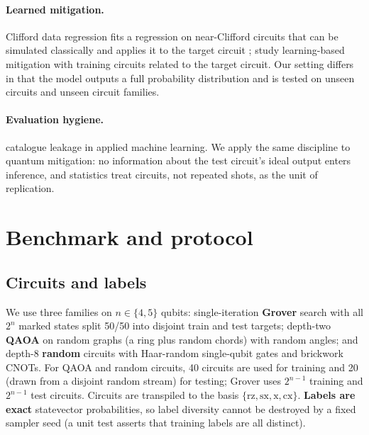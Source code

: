 \documentclass[11pt]{article}
\begin{document}
\paragraph{Learned mitigation.} Clifford data regression fits a regression on near-Clifford circuits that can be simulated classically and applies it to the target circuit \citep{czarnik2021}; \citet{strikis2021} study learning-based mitigation with training circuits related to the target circuit. Our setting differs in that the model outputs a full probability distribution and is tested on unseen circuits and unseen circuit families.
\paragraph{Evaluation hygiene.} \citet{kapoor2023} catalogue leakage in applied machine learning. We apply the same discipline to quantum mitigation: no information about the test circuit's ideal output enters inference, and statistics treat circuits, not repeated shots, as the unit of replication.

\section{Benchmark and protocol}\label{sec:protocol}
\subsection{Circuits and labels}
We use three families on $n\in\{4,5\}$ qubits: single-iteration \textbf{Grover} search \citep{grover1996} with all $2^n$ marked states split 50/50 into disjoint train and test targets; depth-two \textbf{QAOA} \citep{farhi2014} on random graphs (a ring plus random chords) with random angles; and depth-8 \textbf{random} circuits with Haar-random single-qubit gates and brickwork CNOTs. For QAOA and random circuits, 40 circuits are used for training and 20 (drawn from a disjoint random stream) for testing; Grover uses $2^{n-1}$ training and $2^{n-1}$ test circuits. Circuits are transpiled to the basis $\{\mathrm{rz},\mathrm{sx},\mathrm{x},\mathrm{cx}\}$. \textbf{Labels are exact} statevector probabilities, so label diversity cannot be destroyed by a fixed sampler seed (a unit test asserts that training labels are all distinct).
\end{document}
